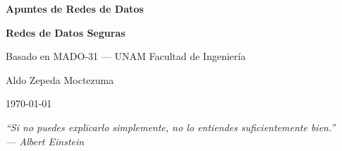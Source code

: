 \documentclass[12pt, a4paper]{book}
\begin{document}
\renewcommand{\chaptermark}[1]{\markboth{\chaptername\ \thechapter.\ #1}{}}
\renewcommand{\sectionmark}[1]{\markright{\thesection.\ #1}}

\begin{titlepage}
    \centering
    \vspace*{2cm}
    {\Huge\bfseries {} Apuntes de Redes de Datos\par}
    \vspace{0.5cm}
    {\Large\bfseries Redes de Datos Seguras\par}
    \vspace{1cm}
    {\large Basado en MADO-31 --- UNAM Facultad de Ingeniería\par}
    \vspace{0.5cm}
    {\large Aldo Zepeda Moctezuma\par}
    \vspace{0.5cm}
    {\normalsize \today\par}
    \vspace{2cm}
    {\large\itshape ``Si no puedes explicarlo simplemente, no lo entiendes suficientemente bien.''\\[4pt]
    --- Albert Einstein\par}
\end{titlepage}

\tableofcontents
\newpage











\end{document}
